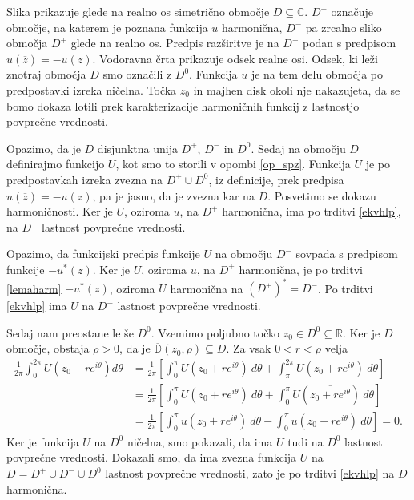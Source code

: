 \documentclass[mat1, tisk]{fmfdelo}
\begin{document}
\begin{opomba}
    Slika prikazuje glede na realno os simetrično območje $D \subseteq \mathbb{C}$. $D^{+}$ označuje območje, na katerem je poznana funkcija $u$ harmonična, $D^{-}$ pa zrcalno sliko območja $D^+$ glede na realno os. 
    Predpis razširitve je na $D^-$ podan s predpisom \mbox{$u(\overline{z}) = - u(z)$}.
    Vodoravna črta prikazuje odsek realne osi. Odsek, ki leži znotraj območja $D$ smo označili z $D^0$. Funkcija $u$ je na tem delu območja po predpostavki izreka ničelna.
    Točka $z_0$ in majhen disk okoli nje nakazujeta, da se bomo dokaza lotili prek karakterizacije harmoničnih funkcij z lastnostjo povprečne vrednosti.
    \end{opomba}

    \begin{dokaz}
        Opazimo, da je $D$ disjunktna unija $D^+$, $D^-$ in $D^0$.
        Sedaj na območju $D$ definirajmo funkcijo $U$, kot smo to storili v opombi \ref{op_spz}.
        Funkcija $U$ je po predpostavkah izreka zvezna na $D^+ \cup D^0$, iz definicije, prek predpisa $u(\overline{z}) = - u(z)$, pa je jasno, da je zvezna kar na $D$. 
        Posvetimo se dokazu harmoničnosti.
        Ker je $U$, oziroma $u$, na $D^+$ harmonična, ima po trditvi \ref{ekvhlp}, na $D^+$ lastnost povprečne vrednosti. 

        Opazimo, da funkcijski predpis funkcije $U$ na območju $D^-$ sovpada s predpisom funkcije $- u^*(z)$. 
        Ker je $U$, oziroma $u$, na $D^+$ harmonična, je po trditvi \ref{lemaharm} $-u^*(z)$, oziroma $U$ harmonična na $(D^+)^* = D^-$.
        Po trditvi \ref{ekvhlp} ima $U$ na $D^-$ lastnost povprečne vrednosti. 
        
        Sedaj nam preostane le še $D^0$.
        Vzemimo poljubno točko $z_0 \in D^0 \subseteq \mathbb{R}$. Ker je $D$ območje, obstaja $\rho > 0$, da je $\overline{\mathbb{D}}(z_0, \rho) \subseteq D$. Za vsak $0 < r < \rho$ velja
        \begin{align*}
            \frac{1}{2 \pi} \int_{0}^{2 \pi}{U(z_0 + re^{i \theta}) d\theta} &= \frac{1}{2 \pi} \left[\int_{0}^{\pi}U(z_0 + re^{i \theta})~d\theta + \int_{\pi}^{2\pi} U(z_0 + re^{i \theta})~d\theta\right] \\
            & = \frac{1}{2 \pi} \left[\int_{0}^{\pi}U(z_0 + re^{i \theta})~d\theta + \int_{0}^{\pi}U(\overline{z_0 + re^{i \theta}})~d\theta\right] \\
            &= \frac{1}{2 \pi} \left[\int_{0}^{\pi}u(z_0 + re^{i \theta})~d\theta - \int_{0}^{\pi}u(z_0 + re^{i \theta})~d\theta\right] = 0.
        \end{align*}        
        Ker je funkcija $U$ na $D^0$ ničelna, smo pokazali, da ima $U$ tudi na $D^0$ lastnost povprečne vrednosti. 
        Dokazali smo, da ima zvezna funkcija $U$ na $D = D^+ \cup D^- \cup D^0$ lastnost povprečne vrednosti, zato je po trditvi \ref{ekvhlp} na $D$ harmonična.
    \end{dokaz}
\end{document}
